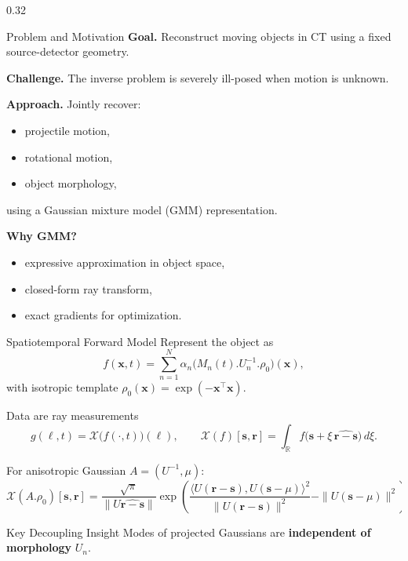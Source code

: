 \documentclass[final]{beamer}
\newcommand{\R}{\mathbb{R}}
\newcommand{\RayTran}{\mathcal{X}}
\begin{document}
\begin{frame}[t]
\begin{columns}[t,totalwidth=\textwidth]

\begin{column}{0.32\textwidth}

\begin{block}{Problem and Motivation}
\textbf{Goal.} Reconstruct moving objects in CT using a fixed source-detector geometry.

\vspace{0.4em}
\textbf{Challenge.} The inverse problem is severely ill-posed when motion is unknown.

\vspace{0.4em}
\textbf{Approach.} Jointly recover:
\begin{itemize}
\item projectile motion,
\item rotational motion,
\item object morphology,
\end{itemize}
using a Gaussian mixture model (GMM) representation.

\vspace{0.4em}
\textbf{Why GMM?}
\begin{itemize}
\item expressive approximation in object space,
\item closed-form ray transform,
\item exact gradients for optimization.
\end{itemize}
\end{block}

\begin{block}{Spatiotemporal Forward Model}
Represent the object as
\[
 f(\bm{x},t)=\sum_{n=1}^{N}\alpha_n\bigl(M_n(t).U_n^{-1}.\rho_0\bigr)(\bm{x}),
\]
with isotropic template $\rho_0(\bm{x})=\exp(-\bm{x}^\top\bm{x})$.

Data are ray measurements
\[
 g(\ell,t)=\RayTran\bigl(f(\cdot,t)\bigr)(\ell),\qquad
 \RayTran(f)[\bm{s},\bm{r}] = \int_{\R} f\bigl(\bm{s}+\xi\,\widehat{\bm{r}-\bm{s}}\bigr)\,d\xi.
\]

For anisotropic Gaussian $A=(U^{-1},\mu)$:
\[
\RayTran(A.\rho_0)[\bm{s},\bm{r}] =
\frac{\sqrt{\pi}}{\|U\widehat{\bm{r}-\bm{s}}\|}
\exp\!\left(
\frac{\langle U(\bm{r}-\bm{s}),U(\bm{s}-\mu)\rangle^2}{\|U(\bm{r}-\bm{s})\|^2}
-\|U(\bm{s}-\mu)\|^2
\right).
\]
\end{block}

\begin{alertblock}{Key Decoupling Insight}
Modes of projected Gaussians are \textbf{independent of morphology} $U_n$.


\end{alertblock}
\end{column}
\end{columns}
\end{frame}
\end{document}
